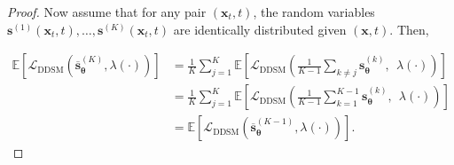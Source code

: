 \documentclass[10pt,a4paper]{amsart}
\newcommand{\DDSM}{\text{DDSM}}
\def\rvx{{\mathbf{x}}}
\def\vs{{\bm{s}}}
\def\vtheta{{\bm{\theta}}}
\begin{document}
\begin{proof}
Now assume that for any pair $(\rvx_t,t)$, the random variables $\vs^{(1)}(\rvx_t,t),\dots,\vs^{(K)}(\rvx_t,t)$ are identically distributed given $(\rvx,t)$. Then,

\begin{align}
\mathbb{E}[\mathcal{L}_\DDSM(\overline{\vs}_\vtheta^{(K)},\lambda(\cdot))] & = \frac{1}{K} \sum_{j=1}^K \mathbb{E}  \left[ \mathcal{L}_\DDSM\left(\frac{1}{K-1} \sum_{k \neq j} \vs_\vtheta^{(k)},\:\:\lambda(\cdot)\right) \right] \\
& = \frac{1}{K} \sum_{j=1}^K \mathbb{E}  \left[ \mathcal{L}_\DDSM\left(\frac{1}{K-1} \sum_{k = 1}^{K-1} \vs_\vtheta^{(k)},\:\:\lambda(\cdot)\right) \right] \\
& = \mathbb{E}  \left[ \mathcal{L}_\DDSM\left(\overline{\vs}_\vtheta^{(K-1)},\lambda(\cdot)\right) \right].
\end{align}

\end{proof}
\end{document}
